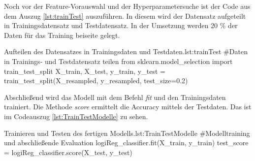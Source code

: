 Noch vor der Feature-Vorauswahl und der Hyperparametersuche ist der Code aus dem Auszug \ref{lst:trainTest} auszuführen. In diesem wird der Datensatz aufgeteilt in Trainingsdatensatz und Testdatensatz. In der Umsetzung werden 20 \% der Daten für das Training beiseite gelegt. 

\begin{pythoncode}{Aufteilen des Datensatzes in Trainingsdaten und Testdaten.}{lst:trainTest}
#Daten in Trainings- und Testdatensatz teilen 
from sklearn.model_selection import train_test_split
X_train, X_test, y_train, y_test = train_test_split(X_resampled, y_resampled, test_size=0.2)
\end{pythoncode}

Abschließend wird das Modell mit dem Befehl \textit{fit} und den Trainingsdaten trainiert. Die Methode \textit{score} ermittelt die Accuracy mittels der Testdaten. Das ist im Codeauszug \ref{lst:TrainTestModelle} zu sehen. 

\begin{pythoncode}{Trainieren und Testen des fertigen Modells.}{lst:TrainTestModelle}
#Modelltraining und abschließende Evaluation
logiReg_classifier.fit(X_train, y_train)
test_score = logiReg_classifier.score(X_test, y_test)
\end{pythoncode}